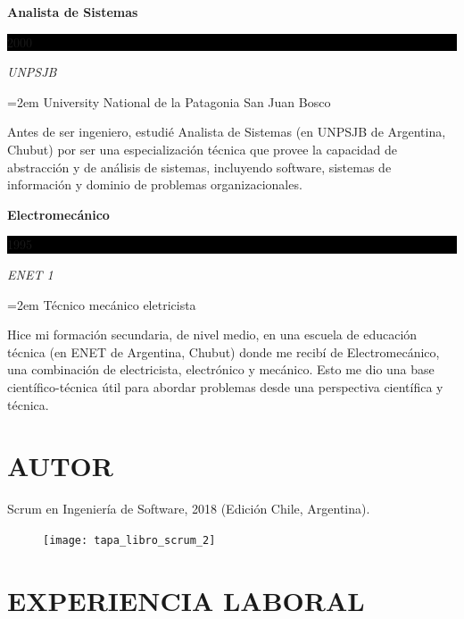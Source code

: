 \documentclass[paper=a4,fontsize=11pt]{scrartcl} %
\newcommand{\sepspace}{\vspace*{1em}}		%
\newcommand{\NewPart}[1]{\section*{\uppercase{#1}}}
\newcommand{\BookEntry}[1]{
\noindent %

}    %
\newcommand{\EducationEntry}[4]{
		\noindent \textbf{#1} \hfill      %
		\colorbox{Black}{%
			\parbox{6em}{%
			\hfill\color{White}#2}} \par  %
		\noindent \textit{#3} \par        %
		\noindent\hangindent=2em\hangafter=0 \small #4 %
		\normalsize \par}
\begin{document}
\EducationEntry{Analista de Sistemas}{2000}{UNPSJB}
{University National de la Patagonia San Juan Bosco}

Antes de ser ingeniero, estudié Analista de Sistemas (en UNPSJB de Argentina, Chubut) por ser una especialización técnica que provee la capacidad de abstracción y de análisis de sistemas, incluyendo software, sistemas de información y dominio de problemas organizacionales. 
\sepspace

\EducationEntry{Electromecánico}{1995}{ENET 1}
{Técnico mecánico eletricista}

Hice mi formación secundaria, de nivel medio, en una escuela de educación técnica (en ENET de Argentina, Chubut) donde me recibí de Electromecánico, una combinación de electricista, electrónico y mecánico. Esto me dio una base científico-técnica útil para abordar problemas desde una perspectiva científica y técnica.
\sepspace

\NewPart{Autor}{}
\BookEntry{}{
\indent
Scrum en Ingeniería de Software, 2018 (Edición Chile, Argentina).
\begin{figure}
    \centering
    \texttt{[image: tapa\_libro\_scrum\_2]}
\end{figure}
\FloatBarrier %
\indent

}
\sepspace
\sepspace
\sepspace
\sepspace
\sepspace
\sepspace\sepspace
\sepspace
\sepspace

\NewPart{Experiencia laboral}{}
\end{document}
